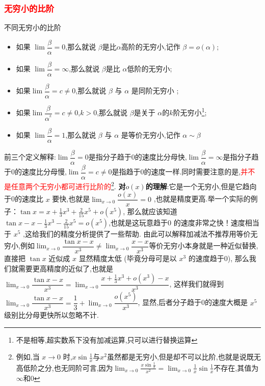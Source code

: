 \documentclass[8pt a4paper, oneside, UTF8]{ctexbook}
\begin{document}
\begin{sloppypar}
    \subsubsection{\textcolor{red}{无穷小的比阶}}
    \begin{defn}{不同无穷小的比阶}{}
        \begin{itemize}
            \item 如果 $\lim \dfrac{\beta}{\alpha} =0$,那么就说 $\beta$是比$\alpha$高阶的无穷小,记作 $\beta=o(\alpha);$
            \item  如果 $\lim \dfrac\beta\alpha  =\infty$,那么就说 $\beta$是比 $\alpha$低阶的无穷小;
            \item 如果$\lim\dfrac{\beta}{\alpha} =c\neq 0$,那么就说 $\beta$ 与 $\alpha$ 是同阶无穷小 ;
            \item 如果$\lim\dfrac{\beta}{\alpha^{^k}} =c \neq 0$,$k > 0$,那么就说 $\beta$是关于 $\alpha$的$k$阶无穷小\footnote{不是相等,超实数系下没有加减运算,只可以进行替换运算};
            \item 如果 $\lim \dfrac\beta\alpha = 1$,那么就说 $\beta$ 与 $\alpha$ 是等价无穷小,记作 $\alpha\sim\beta$
        \end{itemize}
    \end{defn}
    前三个定义解释:$\lim \dfrac{\beta}{\alpha} =0$是指分子趋于$0$的速度比分母快,$\lim \dfrac\beta\alpha =\infty$是指分子趋于$0$的速度比分母慢,$\lim\dfrac{\beta}{\alpha} =c\neq 0$是指趋于$0$的速度一样.同时需要注意的是,\textcolor{red}{并不是任意两个无穷小都可进行比阶的}\footnote{例如,当 $x\to 0$ 时,$x\sin\frac1x$与$x^2$虽然都是无穷小,但是却不可以比阶,也就是说既无高低阶之分,也无同阶可言,因为$\lim_{x \to 0}\frac{x \sin \frac{1}{x}}{x^2}=\lim_{x\to0}\frac1x\sin\frac1x$不存在,其值为$\infty$和$0$}.
    \newline
    \textbf{对$o(x)$的理解}:它是一个无穷小,但是它趋向于0的速度比 $x$ 要快,也就是$\lim_{x\to0}\dfrac{o(x)}{x}=0$ ,也就是精度更高.举一个实际的例子：$\tan x=x+\frac13x^3+\frac2{15}x^5+o\left(x^5\right)$, 那么就应该知道$\tan x-x-\frac{1}{3}x^{3}-\frac{2}{15}x^{5}=o\left(x^{5}\right)$,也就是这玩意趋于0 的速度非常之快！速度相当于 $x^5$ ,这给我们的精度分析提供了一些帮助. 由此可以解释加减法不推荐用等价无穷小,例如$\lim_{x\to0}\dfrac{\tan x-x}{x^3}\neq\lim_{x\to0}\dfrac{x-x}{x^3}$等价无穷小本身就是一种近似替换,直接把 $\tan x$ 近似成 $x$ 显然精度太低 (毕竟分母可是以 $x^3$ 的速度趋于0), 那么我们就需要更高精度的近似了,也就是 $\lim_{x\to0}\dfrac{\tan x-x}{x^3}=\lim_{x\to0}\dfrac{x+\frac13x^3+o\left(x^3\right)-x}{x^3}$, 这样我们就得到 $\lim_{x\to0}\dfrac{\tan x-x}{x^3}=\dfrac13+\lim_{x\to0}\dfrac{o(x^5)}{x^3}$, 显然,后者分子趋于0的速度大概是 $x^5$ 级别比分母更快所以忽略不计.\\

\end{sloppypar}
\end{document}
